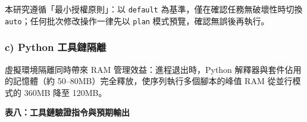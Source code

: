 本研究遵循「最小授權原則」：以 \texttt{default}
為基準，僅在確認任務無破壞性時切換
\texttt{auto}；任何批次修改操作一律先以 \texttt{plan}
模式預覽，確認無誤後再執行。

\subsubsection{c) Python
工具鏈隔離}\label{c-python-ux5de5ux5177ux93c8ux9694ux96e2}

\begin{Shaded}
\begin{Highlighting}[]
 

\DataTypeTok{\textbackslash{}}

\end{Highlighting}
\end{Shaded}

虛擬環境隔離同時帶來 RAM 管理效益：進程退出時，Python
解釋器與套件佔用的記憶體（約
50--80MB）完全釋放，使序列執行多個腳本的峰值 RAM 從並行模式的 360MB 降至
120MB。

\textbf{表八：工具鏈驗證指令與預期輸出}

